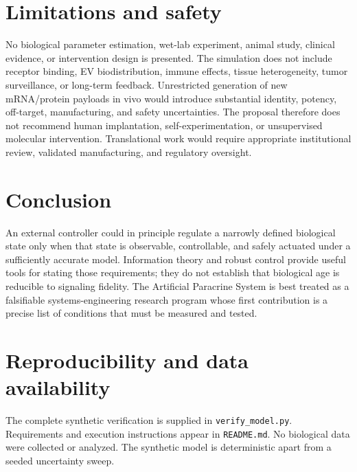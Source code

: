 \documentclass[11pt]{article}
\begin{document}
\section{Limitations and safety}
No biological parameter estimation, wet-lab experiment, animal study, clinical evidence, or intervention design is presented. The simulation does not include receptor binding, EV biodistribution, immune effects, tissue heterogeneity, tumor surveillance, or long-term feedback. Unrestricted generation of new mRNA/protein payloads in vivo would introduce substantial identity, potency, off-target, manufacturing, and safety uncertainties. The proposal therefore does not recommend human implantation, self-experimentation, or unsupervised molecular intervention. Translational work would require appropriate institutional review, validated manufacturing, and regulatory oversight.

\section{Conclusion}
An external controller could in principle regulate a narrowly defined biological state only when that state is observable, controllable, and safely actuated under a sufficiently accurate model. Information theory and robust control provide useful tools for stating those requirements; they do not establish that biological age is reducible to signaling fidelity. The Artificial Paracrine System is best treated as a falsifiable systems-engineering research program whose first contribution is a precise list of conditions that must be measured and tested.

\section*{Reproducibility and data availability}
The complete synthetic verification is supplied in \texttt{verify\_model.py}. Requirements and execution instructions appear in \texttt{README.md}. No biological data were collected or analyzed. The synthetic model is deterministic apart from a seeded uncertainty sweep.
\end{document}

